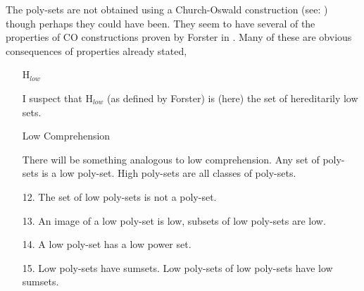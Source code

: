 \documentclass[numreferences]{rbjk}
\begin{document}
\begin{article}
\begin{itemize}
The poly-sets are not obtained using a Church-Oswald construction (see: \cite{forster2005}) though perhaps they could have been.
They seem to have several of the properties of CO constructions proven by Forster in \cite{forster2005}.
Many of these are obvious consequences of properties already stated,

\begin{itemize}

\item[H$_{low}$]\ 

I suspect that H$_{low}$ (as defined by Forster\cite{forster2005}) is (here) the set of hereditarily low sets.

\item[Low Comprehension]\ 

There will be something analogous to low comprehension.
Any set of poly-sets is a low poly-set.
High poly-sets are all classes of poly-sets.

\item[12.] The set of low poly-sets is not a poly-set.

\item[13.] An image of a low poly-set is low, subsets of low poly-sets are low.

\item[14.] A low poly-set has a low power set.

\item[15.] Low poly-sets have sumsets. Low poly-sets of low poly-sets have low sumsets.

\end{itemize}
\end{itemize}

{\raggedright


} %


\end{article}
\end{document}
